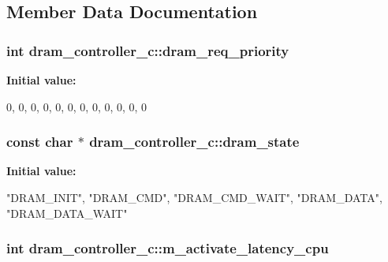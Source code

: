 \subsection{Member Data Documentation}
\hypertarget{classdram__controller__c_aceae2c83e6d35b3408b2b04efc8530b0}{
\subsubsection[{dram\_\-req\_\-priority}]{\setlength{\rightskip}{0pt plus 5cm}int dram\_\-controller\_\-c::dram\_\-req\_\-priority}}
\label{classdram__controller__c_aceae2c83e6d35b3408b2b04efc8530b0}
{\bfseries Initial value:}
\begin{DoxyCode}
 
{
  0, 
  0, 
  0, 
  0, 
  0, 
  0, 
  0, 
  0, 
  0, 
  0, 
  0, 
  0  
}
\end{DoxyCode}
\hypertarget{classdram__controller__c_a5446c9ac632452dd729e7fed183fc443}{
\subsubsection[{dram\_\-state}]{\setlength{\rightskip}{0pt plus 5cm}const char $\ast$ dram\_\-controller\_\-c::dram\_\-state}}
\label{classdram__controller__c_a5446c9ac632452dd729e7fed183fc443}
{\bfseries Initial value:}
\begin{DoxyCode}
 {
  "DRAM_INIT",
  "DRAM_CMD",
  "DRAM_CMD_WAIT",
  "DRAM_DATA",
  "DRAM_DATA_WAIT"
}
\end{DoxyCode}
\hypertarget{classdram__controller__c_abb28f2d1c7793e514a005a7bc15589d9}{
\subsubsection[{m\_\-activate\_\-latency\_\-cpu}]{\setlength{\rightskip}{0pt plus 5cm}int {\bf dram\_\-controller\_\-c::m\_\-activate\_\-latency\_\-cpu}}}
